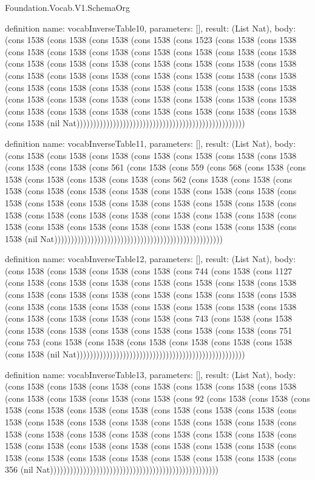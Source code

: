 \begin{lexlean}{Foundation.Vocab.V1.SchemaOrg}
\begin{semanticmodule}
definition{
  name: vocabInverseTable10,
  parameters: [],
  result: (List Nat),
  body: (cons 1538 (cons 1538 (cons 1538 (cons 1538 (cons 1523 (cons 1538 (cons 1538 (cons 1538 (cons 1538 (cons 1538 (cons 1538 (cons 1538 (cons 1538 (cons 1538 (cons 1538 (cons 1538 (cons 1538 (cons 1538 (cons 1538 (cons 1538 (cons 1538 (cons 1538 (cons 1538 (cons 1538 (cons 1538 (cons 1538 (cons 1538 (cons 1538 (cons 1538 (cons 1538 (cons 1538 (cons 1538 (cons 1538 (cons 1538 (cons 1538 (cons 1538 (cons 1538 (cons 1538 (cons 1538 (cons 1538 (cons 1538 (cons 1538 (cons 1538 (cons 1538 (cons 1538 (cons 1538 (cons 1538 (cons 1538 (cons 1538 (cons 1538 (nil Nat)))))))))))))))))))))))))))))))))))))))))))))))))))
}

definition{
  name: vocabInverseTable11,
  parameters: [],
  result: (List Nat),
  body: (cons 1538 (cons 1538 (cons 1538 (cons 1538 (cons 1538 (cons 1538 (cons 1538 (cons 1538 (cons 1538 (cons 561 (cons 1538 (cons 559 (cons 568 (cons 1538 (cons 1538 (cons 1538 (cons 1538 (cons 1538 (cons 562 (cons 1538 (cons 1538 (cons 1538 (cons 1538 (cons 1538 (cons 1538 (cons 1538 (cons 1538 (cons 1538 (cons 1538 (cons 1538 (cons 1538 (cons 1538 (cons 1538 (cons 1538 (cons 1538 (cons 1538 (cons 1538 (cons 1538 (cons 1538 (cons 1538 (cons 1538 (cons 1538 (cons 1538 (cons 1538 (cons 1538 (cons 1538 (cons 1538 (cons 1538 (cons 1538 (cons 1538 (nil Nat)))))))))))))))))))))))))))))))))))))))))))))))))))
}

definition{
  name: vocabInverseTable12,
  parameters: [],
  result: (List Nat),
  body: (cons 1538 (cons 1538 (cons 1538 (cons 1538 (cons 744 (cons 1538 (cons 1127 (cons 1538 (cons 1538 (cons 1538 (cons 1538 (cons 1538 (cons 1538 (cons 1538 (cons 1538 (cons 1538 (cons 1538 (cons 1538 (cons 1538 (cons 1538 (cons 1538 (cons 1538 (cons 1538 (cons 1538 (cons 1538 (cons 1538 (cons 1538 (cons 1538 (cons 1538 (cons 1538 (cons 1538 (cons 1538 (cons 743 (cons 1538 (cons 1538 (cons 1538 (cons 1538 (cons 1538 (cons 1538 (cons 1538 (cons 1538 (cons 751 (cons 753 (cons 1538 (cons 1538 (cons 1538 (cons 1538 (cons 1538 (cons 1538 (cons 1538 (nil Nat)))))))))))))))))))))))))))))))))))))))))))))))))))
}

definition{
  name: vocabInverseTable13,
  parameters: [],
  result: (List Nat),
  body: (cons 1538 (cons 1538 (cons 1538 (cons 1538 (cons 1538 (cons 1538 (cons 1538 (cons 1538 (cons 1538 (cons 1538 (cons 1538 (cons 92 (cons 1538 (cons 1538 (cons 1538 (cons 1538 (cons 1538 (cons 1538 (cons 1538 (cons 1538 (cons 1538 (cons 1538 (cons 1538 (cons 1538 (cons 1538 (cons 1538 (cons 1538 (cons 1538 (cons 1538 (cons 1538 (cons 1538 (cons 1538 (cons 1538 (cons 1538 (cons 1538 (cons 1538 (cons 1538 (cons 1538 (cons 1538 (cons 1538 (cons 1538 (cons 1538 (cons 1538 (cons 1538 (cons 1538 (cons 1538 (cons 1538 (cons 1538 (cons 1538 (cons 356 (nil Nat)))))))))))))))))))))))))))))))))))))))))))))))))))
}


\end{semanticmodule}
\end{lexlean}
